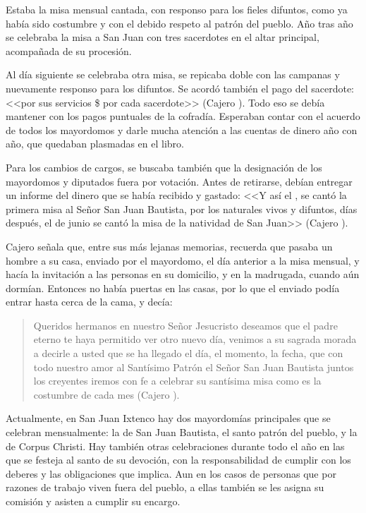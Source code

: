 \documentclass[14pt,letterpaper,twoside]{extbook} %
\begin{document}
Estaba la misa mensual cantada, con responso para los fieles difuntos, como ya había sido costumbre y con el debido respeto al patrón del pueblo. Año tras año se celebraba la misa a San Juan con tres sacerdotes en el altar principal, acompañada de su procesión.

Al día siguiente se celebraba otra misa, se repicaba doble con las campanas y nuevamente responso para los difuntos. Se acordó también el pago del sacerdote: <<por sus servicios \$ por cada sacerdote>> (Cajero ). Todo eso se debía mantener con los pagos puntuales de la cofradía. Esperaban contar con el acuerdo de todos los mayordomos y darle mucha atención a las cuentas de dinero año con año, que quedaban plasmadas en el libro.

Para los cambios de cargos, se buscaba también que la designación de los mayordomos y diputados fuera por votación. Antes de retirarse, debían entregar un informe del dinero que se había recibido y gastado: <<Y así el , se cantó la primera misa al Señor San Juan Bautista, por los naturales vivos y difuntos,  días después, el  de junio se cantó la
misa de la natividad de San Juan>> (Cajero ).

Cajero señala que, entre sus más lejanas memorias, recuerda que pasaba un hombre a su casa, enviado por el mayordomo, el día anterior a la misa mensual, y hacía la invitación a las personas en su domicilio, y en la madrugada, cuando aún dormían. Entonces no había puertas en las casas, por lo que el enviado podía entrar hasta cerca de la cama, y decía:

\begin{quotation}
\noindent Queridos hermanos en nuestro Señor Jesucristo deseamos que el padre eterno te haya permitido ver otro nuevo día, venimos a su sagrada morada a decirle a usted que se ha llegado el día, el momento, la fecha, que con todo nuestro amor al Santísimo Patrón el Señor San Juan Bautista juntos los creyentes iremos con fe a celebrar su santísima misa como es la costumbre de cada mes (Cajero ).
\end{quotation}

\noindent Actualmente, en San Juan Ixtenco hay dos mayordomías principales que se celebran mensualmente: la de San Juan Bautista, el santo patrón del pueblo, y la de Corpus Christi. Hay también otras celebraciones durante todo el año en las que se festeja al santo de su devoción, con la responsabilidad de cumplir con los deberes y las obligaciones que implica. Aun en los casos de personas que por razones de trabajo viven fuera del pueblo, a ellas también se les asigna su comisión y asisten a cumplir su encargo.
\end{document}
